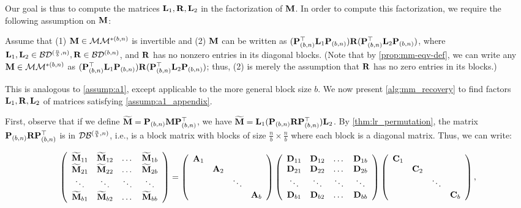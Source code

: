 Our goal is thus to compute the matrices $\mathbf{L}_1,\mathbf{R},\mathbf{L}_2$ in the factorization of $\mathbf{M}$.
In order to compute this factorization, we require the following assumption on $\mathbf{M}$:
\begin{assumption}
\label{assump:a1_appendix}
Assume that (1) $\mathbf{M} \in \mathcal{M}\mathcal{M}^{*(b,n)}$ is invertible and (2) $\mathbf{M}$ can be written as $(\mathbf{P}_{(b,n)}^\top \mathbf{L}_1 \mathbf{P}_{(b,n)}) \mathbf{R} (\mathbf{P}_{(b,n)}^\top\mathbf{L}_2\mathbf{P}_{(b,n)})$, where $\mathbf{L}_1,\mathbf{L}_2 \in \mathcal{B}\mathcal{D}^{(\frac{n}{b},n)},\mathbf{R} \in \mathcal{B}\mathcal{D}^{(b,n)}$, and $\mathbf{R}$ has no nonzero entries in its diagonal blocks.
(Note that by \cref{prop:mm-eqv-def}, we can write any $\mathbf{M} \in \mathcal{M}\mathcal{M}^{*(b,n)}$ as $(\mathbf{P}_{(b,n)}^\top \mathbf{L}_1 \mathbf{P}_{(b,n)}) \mathbf{R} (\mathbf{P}_{(b,n)}^\top\mathbf{L}_2\mathbf{P}_{(b,n)})$; thus, (2) is merely the assumption that $\mathbf{R}$ has no zero entries in its blocks.)
\end{assumption}%

This is analogous to \cref{assump:a1}, except applicable to the more general block size $b$.
We now present \cref{alg:mm_recovery} to find factors $\mathbf{L}_1,\mathbf{R},\mathbf{L}_2$ of matrices satisfying \cref{assump:a1_appendix}.

First, observe that if we define $\widetilde{\mathbf{M}} = \mathbf{P}_{(b,n)} \mathbf{M} \mathbf{P}_{(b,n)}^\top$, we have $\widetilde{\mathbf{M}} = \mathbf{L}_1 (\mathbf{P}_{(b,n)} \mathbf{R} \mathbf{P}_{(b,n)}^\top) \mathbf{L}_2$. By \cref{thm:lr_permutation}, the matrix $\mathbf{P}_{(b,n)} \mathbf{R} \mathbf{P}_{(b,n)}^\top$ is in $\mathcal{D}\mathcal{B}^{(\frac{n}{b}, n)}$, i.e., is a block matrix with blocks of size $\frac{n}{b} \times \frac{n}{b}$ where each block is a diagonal matrix.
Thus, we can write:

\begin{equation*}
\left( \begin{array}{cccc} \widetilde{\mathbf{M}}_{11} & \widetilde{\mathbf{M}}_{12} & \dots & \widetilde{\mathbf{M}}_{1b} \\ \widetilde{\mathbf{M}}_{21} & \widetilde{\mathbf{M}}_{22} & \dots & \widetilde{\mathbf{M}}_{2b} \\ \ddots & \ddots & \ddots & \ddots  \\ \widetilde{\mathbf{M}}_{b1} & \widetilde{\mathbf{M}}_{b2} & \dots & \widetilde{\mathbf{M}}_{bb} \end{array}\right)
= \left( \begin{array}{ccccc} \mathbf{A}_1 \\ & \mathbf{A}_2 \\ & & \ddots \\ & & & \mathbf{A}_{b} \end{array}\right)
\left( \begin{array}{cccc} \mathbf{D}_{11} & \mathbf{D}_{12} & \dots & \mathbf{D}_{1b} \\ \mathbf{D}_{21} & \mathbf{D}_{22} & \dots & \mathbf{D}_{2b} \\ \ddots & \ddots & \ddots & \ddots  \\ \mathbf{D}_{b1} & \mathbf{D}_{b2} & \dots & \mathbf{D}_{bb} \end{array}\right)
\left( \begin{array}{ccccc} \mathbf{C}_1 \\ & \mathbf{C}_2 \\ & & \ddots \\ & & & \mathbf{C}_{b} \end{array}\right),
\end{equation*}

